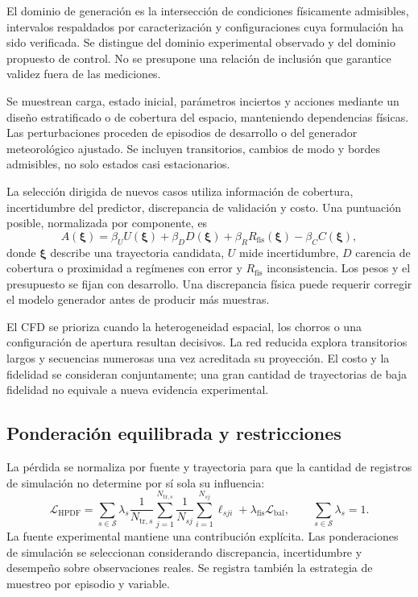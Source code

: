 El dominio de generación es la intersección de condiciones físicamente admisibles, intervalos respaldados por caracterización y configuraciones cuya formulación ha sido verificada. Se distingue del dominio experimental observado y del dominio propuesto de control. No se presupone una relación de inclusión que garantice validez fuera de las mediciones.

Se muestrean carga, estado inicial, parámetros inciertos y acciones mediante un diseño estratificado o de cobertura del espacio, manteniendo dependencias físicas. Las perturbaciones proceden de episodios de desarrollo o del generador meteorológico ajustado. Se incluyen transitorios, cambios de modo y bordes admisibles, no solo estados casi estacionarios.

La selección dirigida de nuevos casos utiliza información de cobertura, incertidumbre del predictor, discrepancia de validación y costo. Una puntuación posible, normalizada por componente, es
\begin{equation}
A(\boldsymbol\xi)=
\beta_U U(\boldsymbol\xi)+
\beta_D D(\boldsymbol\xi)+
\beta_R R_{\mathrm{fis}}(\boldsymbol\xi)-
\beta_C C(\boldsymbol\xi),
\label{met:adquisicion}
\end{equation}
donde $\boldsymbol\xi$ describe una trayectoria candidata, $U$ mide incertidumbre, $D$ carencia de cobertura o proximidad a regímenes con error y $R_{\mathrm{fis}}$ inconsistencia. Los pesos y el presupuesto se fijan con desarrollo. Una discrepancia física puede requerir corregir el modelo generador antes de producir más muestras.

El CFD se prioriza cuando la heterogeneidad espacial, los chorros o una configuración de apertura resultan decisivos. La red reducida explora transitorios largos y secuencias numerosas una vez acreditada su proyección. El costo y la fidelidad se consideran conjuntamente; una gran cantidad de trayectorias de baja fidelidad no equivale a nueva evidencia experimental.

\subsection{Ponderación equilibrada y restricciones}

La pérdida se normaliza por fuente y trayectoria para que la cantidad de registros de simulación no determine por sí sola su influencia:
\begin{equation}
\mathcal L_{\mathrm{HPDF}}=
\sum_{s\in\mathcal S}
\lambda_s\frac{1}{N_{\mathrm{tr},s}}
\sum_{j=1}^{N_{\mathrm{tr},s}}
\frac{1}{N_{sj}}\sum_{i=1}^{N_{sj}}
\ell_{sji}
+\lambda_{\mathrm{fis}}\mathcal L_{\mathrm{bal}},
\qquad
\sum_{s\in\mathcal S}\lambda_s=1.
\label{met:perdida_hpdf}
\end{equation}
La fuente experimental mantiene una contribución explícita. Las ponderaciones de simulación se seleccionan considerando discrepancia, incertidumbre y desempeño sobre observaciones reales. Se registra también la estrategia de muestreo por episodio y variable.


